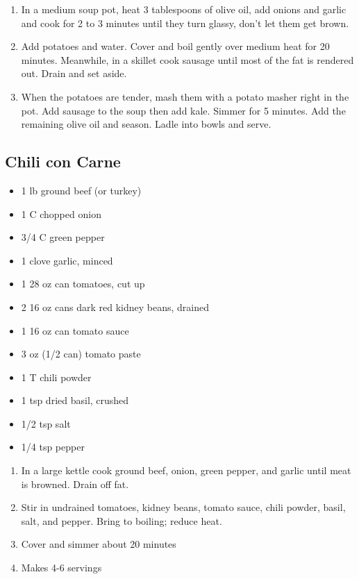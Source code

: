 \documentclass{article}
\begin{document}
\begin{enumerate}
    \item 
        In a medium soup pot, heat 3 tablespoons of olive oil, add onions and garlic and cook for 2 to 3 minutes until they turn glassy, don't let them get brown. 
    \item 
        Add potatoes and water. Cover and boil gently over medium heat for 20 minutes. Meanwhile, in a skillet cook sausage until most of the fat is rendered out. Drain and set aside. 
    \item 
        When the potatoes are tender, mash them with a potato masher right in the pot. Add sausage to the soup then add kale. Simmer for 5 minutes. Add the remaining olive oil and season. Ladle into bowls and serve.
\end{enumerate}
\newpage

\subsection{Chili con Carne} 

\begin{framed}
    \begin{itemize}
        \item 1 lb ground beef (or turkey)
        \item 1 C chopped onion
        \item 3/4 C green pepper
        \item 1 clove garlic, minced
        \item 1 28 oz can tomatoes, cut up
        \item 2 16 oz cans dark red kidney beans, drained
        \item 1 16 oz can tomato sauce
        \item 3 oz (1/2 can) tomato paste
        \item 1 T chili powder
        \item 1 tsp dried basil, crushed
        \item 1/2 tsp salt
        \item 1/4 tsp pepper
    \end{itemize}
\end{framed}

\begin{enumerate}
    \item
        In a large kettle cook ground beef, onion, green pepper, and garlic until meat is browned. Drain off fat.
    \item
        Stir in undrained tomatoes, kidney beans, tomato sauce, chili powder, basil, salt, and pepper. Bring to boiling; reduce heat.
    \item
        Cover and simmer about 20 minutes
    \item
        Makes 4-6 servings
\end{enumerate}
\newpage
\end{document}

